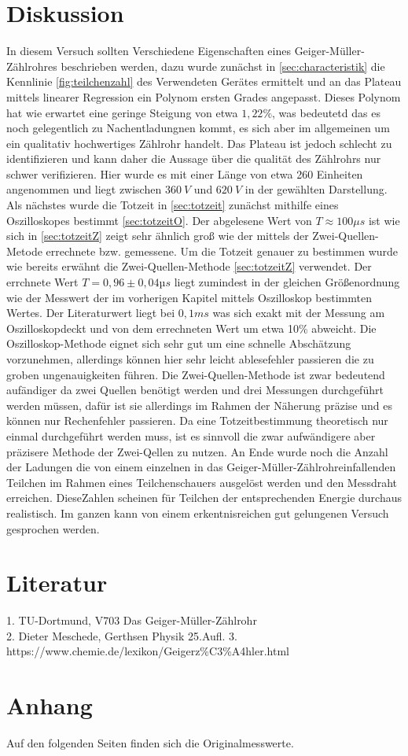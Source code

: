 \section{Diskussion}
\label{sec:diskussion}
In diesem Versuch sollten Verschiedene Eigenschaften eines Geiger-Müller-Zählrohres beschrieben werden, dazu 
wurde zunächst in \autoref{sec:characteristik} die Kennlinie \autoref{fig:teilchenzahl} 
des Verwendeten Gerätes ermittelt und an das Plateau mittels linearer Regression ein Polynom ersten Grades 
angepasst. Dieses Polynom hat wie erwartet eine geringe Steigung von etwa $1,22\%$, was bedeutetd das es noch 
gelegentlich zu Nachentladungnen kommt, es sich aber im allgemeinen um ein qualitativ hochwertiges Zählrohr handelt.
Das Plateau ist jedoch schlecht zu identifizieren und kann daher die Aussage über die qualität des Zählrohrs nur  schwer
verifizieren. Hier wurde es mit einer Länge von etwa 260 Einheiten angenommen und liegt 
zwischen $\SI{360}{V}$ und $\SI{620}{V}$ in der gewählten Darstellung. Als nächstes wurde die Totzeit in 
\autoref{sec:totzeit} zunächst mithilfe eines Oszilloskopes bestimmt \autoref{sec:totzeitO}. 
Der abgelesene Wert von $T\approx 100\mu s$ ist wie sich in \autoref{sec:totzeitZ} zeigt sehr ähnlich groß wie
der mittels der Zwei-Quellen-Metode errechnete bzw. gemessene. Um die Totzeit genauer zu bestimmen wurde wie 
bereits erwähnt die Zwei-Quellen-Methode \autoref{sec:totzeitZ} verwendet. Der errchnete Wert $T=0,96\pm0,04µs$
liegt zumindest in der gleichen Größenordnung wie der Messwert der im vorherigen Kapitel mittels Oszilloskop 
bestimmten Wertes. Der Literaturwert liegt bei $0,1ms$ was sich exakt mit der Messung am Oszilloskopdeckt und
von dem errechneten Wert um etwa 10\% abweicht. Die Oszilloskop-Methode eignet sich sehr gut um eine schnelle 
Abschätzung vorzunehmen, allerdings können hier sehr leicht ablesefehler passieren die zu groben ungenauigkeiten
führen. Die Zwei-Quellen-Methode ist zwar bedeutend aufändiger da zwei Quellen benötigt werden und drei Messungen 
durchgeführt werden müssen, dafür ist sie allerdings im Rahmen der Näherung präzise und es können nur Rechenfehler 
passieren. Da eine Totzeitbestimmung theoretisch nur einmal durchgeführt werden muss, ist es sinnvoll die zwar 
aufwändigere aber präzisere Methode der Zwei-Qellen zu nutzen.  An Ende wurde noch die Anzahl der Ladungen die 
von einem einzelnen in das Geiger-Müller-Zählrohreinfallenden Teilchen im Rahmen eines Teilchenschauers 
ausgelöst werden und den Messdraht erreichen. DieseZahlen scheinen für Teilchen der entsprechenden Energie 
durchaus realistisch. Im ganzen kann von einem erkentnisreichen gut gelungenen Versuch gesprochen werden.

\section{Literatur}
\label{sec:literatur}
1. TU-Dortmund, V703 Das Geiger-Müller-Zählrohr\\
2. Dieter Meschede, Gerthsen Physik 25.Aufl.
3. https://www.chemie.de/lexikon/Geigerz\%C3\%A4hler.html

\section{Anhang}
\label{sec:anhang}
Auf den folgenden Seiten finden sich die Originalmesswerte.
